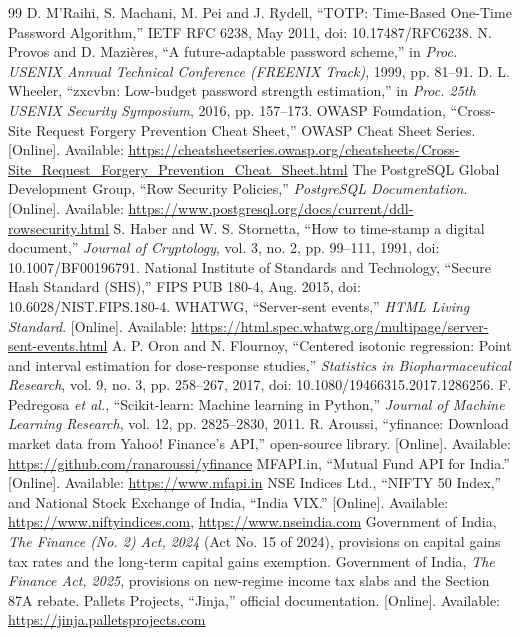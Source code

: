 \begin{thebibliography}{99}
 D. M'Raihi, S. Machani, M. Pei and J. Rydell, ``TOTP: Time-Based One-Time Password Algorithm,'' IETF RFC 6238, May 2011, doi: 10.17487/RFC6238.
 N. Provos and D. Mazières, ``A future-adaptable password scheme,'' in \textit{Proc. USENIX Annual Technical Conference (FREENIX Track)}, 1999, pp. 81--91.
 D. L. Wheeler, ``zxcvbn: Low-budget password strength estimation,'' in \textit{Proc. 25th USENIX Security Symposium}, 2016, pp. 157--173.
 OWASP Foundation, ``Cross-Site Request Forgery Prevention Cheat Sheet,'' OWASP Cheat Sheet Series. [Online]. Available: \url{https://cheatsheetseries.owasp.org/cheatsheets/Cross-Site_Request_Forgery_Prevention_Cheat_Sheet.html}
 The PostgreSQL Global Development Group, ``Row Security Policies,'' \textit{PostgreSQL Documentation}. [Online]. Available: \url{https://www.postgresql.org/docs/current/ddl-rowsecurity.html}
 S. Haber and W. S. Stornetta, ``How to time-stamp a digital document,'' \textit{Journal of Cryptology}, vol. 3, no. 2, pp. 99--111, 1991, doi: 10.1007/BF00196791.
 National Institute of Standards and Technology, ``Secure Hash Standard (SHS),'' FIPS PUB 180-4, Aug. 2015, doi: 10.6028/NIST.FIPS.180-4.
 WHATWG, ``Server-sent events,'' \textit{HTML Living Standard}. [Online]. Available: \url{https://html.spec.whatwg.org/multipage/server-sent-events.html}
 A. P. Oron and N. Flournoy, ``Centered isotonic regression: Point and interval estimation for dose-response studies,'' \textit{Statistics in Biopharmaceutical Research}, vol. 9, no. 3, pp. 258--267, 2017, doi: 10.1080/19466315.2017.1286256.
 F. Pedregosa \textit{et al.}, ``Scikit-learn: Machine learning in Python,'' \textit{Journal of Machine Learning Research}, vol. 12, pp. 2825--2830, 2011.
 R. Aroussi, ``yfinance: Download market data from Yahoo! Finance's API,'' open-source library. [Online]. Available: \url{https://github.com/ranaroussi/yfinance}
 MFAPI.in, ``Mutual Fund API for India.'' [Online]. Available: \url{https://www.mfapi.in}
 NSE Indices Ltd., ``NIFTY 50 Index,'' and National Stock Exchange of India, ``India VIX.'' [Online]. Available: \url{https://www.niftyindices.com}, \url{https://www.nseindia.com}
 Government of India, \textit{The Finance (No. 2) Act, 2024} (Act No. 15 of 2024), provisions on capital gains tax rates and the long-term capital gains exemption.
 Government of India, \textit{The Finance Act, 2025}, provisions on new-regime income tax slabs and the Section 87A rebate.
 Pallets Projects, ``Jinja,'' official documentation. [Online]. Available: \url{https://jinja.palletsprojects.com}
\end{thebibliography}
